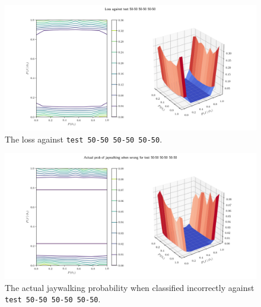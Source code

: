 \documentclass[]{report}
\newcommand{\code}{\texttt}
\begin{document}
\begin{figure}[h]
    \centering
    \centerline{\includegraphics[scale=0.55]{test_50-50_50-50_50-50_loss.png}}
    \caption[]{The loss against \code{test 50-50 50-50 50-50}.}
    \label{fig:test_50-50_50-50_50-50_loss_plot}
\end{figure}

\begin{figure}[h]
    \centering
    \centerline{\includegraphics[scale=0.55]{test_50-50_50-50_50-50_jay_prob.png}}
    \caption[]{The actual jaywalking probability when classified incorrectly against \code{test 50-50 50-50 50-50}.}
    \label{fig:test_50-50_50-50_50-50_jay_prob_plot}
\end{figure}
\end{document}
